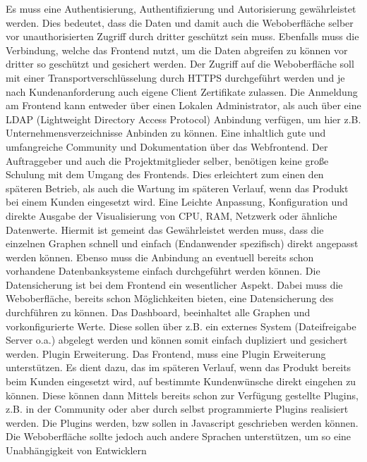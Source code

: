 \begin{outline}
  \1 Es muss eine Authentisierung, Authentifizierung und Autorisierung
  gewährleistet werden. Dies bedeutet, dass die Daten und damit auch die
  Weboberfläche selber vor unauthorisierten Zugriff durch dritter geschützt
  sein muss. Ebenfalls muss die Verbindung, welche das Frontend nutzt, um die
  Daten abgreifen zu können vor dritter so geschützt und gesichert werden. Der
  Zugriff auf die Weboberfläche soll mit einer Transportverschlüsselung durch
  \gls{HTTPS} durchgeführt werden und je nach Kundenanforderung auch eigene
  Client Zertifikate zulassen. Die Anmeldung am Frontend kann entweder über
  einen Lokalen Administrator, als auch über eine LDAP (Lightweight Directory
  Access Protocol) Anbindung verfügen, um hier z.B. Unternehmensverzeichnisse
  Anbinden zu können.
  \1 Eine inhaltlich gute und umfangreiche Community und Dokumentation über das
  Webfrontend. Der Auftraggeber und auch die Projektmitglieder selber,
  benötigen keine große Schulung mit dem Umgang des Frontends. Dies erleichtert
  zum einen den späteren Betrieb, als auch die Wartung im späteren Verlauf,
  wenn das Produkt bei einem Kunden eingesetzt wird.
  \1 Eine Leichte Anpassung, Konfiguration und direkte Ausgabe der
  Visualisierung von CPU, RAM, Netzwerk oder ähnliche Datenwerte. Hiermit ist
  gemeint das Gewährleistet werden muss, dass  die einzelnen Graphen schnell
  und einfach (Endanwender spezifisch) direkt angepasst werden können.  Ebenso
  muss die Anbindung an eventuell bereits schon vorhandene Datenbanksysteme
  einfach durchgeführt werden können.
  \1 Die Datensicherung ist bei dem Frontend ein wesentlicher Aspekt.  Dabei
  muss die Weboberfläche, bereits schon Möglichkeiten bieten, eine
  Datensicherung des  durchführen zu können.
  Das Dashboard, beeinhaltet alle Graphen und vorkonfigurierte Werte. Diese
  sollen über z.B. ein externes System (Dateifreigabe Server o.a.) abgelegt
  werden und können somit einfach dupliziert und gesichert werden.
  \1 Plugin Erweiterung. Das Frontend, muss eine Plugin Erweiterung
  unterstützen. Es dient dazu, das im späteren Verlauf, wenn das Produkt
  bereits beim Kunden eingesetzt wird, auf bestimmte Kundenwünsche direkt
  eingehen zu können. Diese können dann Mittels bereits schon zur Verfügung
  gestellte Plugins, z.B. in der Community oder aber durch selbst programmierte
  Plugins realisiert werden. Die Plugins werden, bzw sollen in Javascript
  geschrieben werden können. Die Weboberfläche sollte jedoch auch andere
  Sprachen unterstützen, um so eine Unabhängigkeit von Entwicklern

\end{outline}
